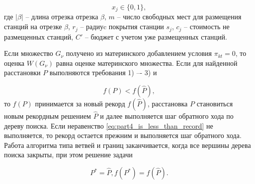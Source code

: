 \begin{displaymath}
    x_j \in \{0, 1\},
\end{displaymath}
где $|\beta|$ -- длина отрезка отрезка  $\beta$, $m$ -- число свободных мест для размещения станций на отрезке $\beta$, $r_j$ -- радиуc покрытия станции $s_j$, $c_j$ -- стоимость не размещенных станций, $C'$ -- бюджет с учетом уже размещенных станций.


Если множество $G_\nu$ получено из материнского добавлением условия $\pi_{kt}=0$, то оценка $W(G_\nu)$ равна оценке материнского множества. Если для найденной расстановки $P$ выполняются требования 1) –- 3) и

\begin{equation}
    \label{eq:part4_is_less_than_record}
    f(P) < f(\widehat{P}),
\end{equation}
то $f(P)$ принимается за новый рекорд $f(\widehat{P})$, расстановка $P$ становиться новым рекордным решением $\widehat{P}$ и далее выполняется шаг обратного хода по дереву поиска. Если неравенство \cref{eq:part4_is_less_than_record} не выполняется, то рекорд остается прежним и выполняется шаг обратного хода. Работа алгоритма типа ветвей и границ заканчивается, когда все вершины дерева поиска закрыты, при этом решение задачи 

\begin{displaymath}
    P^{*} = \widehat{P},  f(P^*) = f(\widehat{P}).
\end{displaymath}





